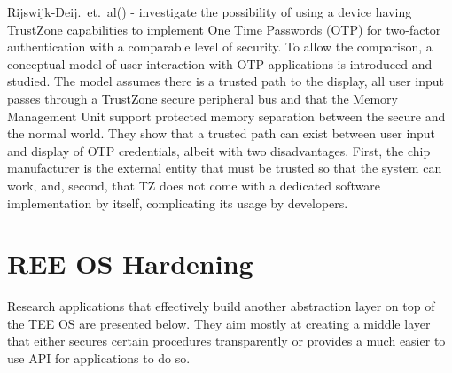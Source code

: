 \documentclass[cameraready]{cseminar}
\begin{document}
Rijswijk-Deij.~et.~al(\cite{twofactorauth}) - investigate the possibility of using a device having TrustZone capabilities to implement One Time Passwords (OTP) for two-factor authentication with a comparable level of security. To allow the comparison, a conceptual model of user interaction with OTP applications is introduced and studied. The model assumes there is a trusted path to the display, all user input passes through a TrustZone secure peripheral bus and that the Memory Management Unit support protected memory separation between the secure and the normal world. They show that a trusted path can exist between user input and display of OTP credentials, albeit with two disadvantages. First, the chip manufacturer is the external entity that must be trusted so that the system can work, and, second, that TZ does not come with a dedicated software implementation by itself, complicating its usage by developers.


\section{REE OS Hardening}
\label{osapps}

Research applications that effectively build another abstraction layer on top of the TEE OS are presented below. They aim mostly at creating a middle layer that either secures certain procedures transparently or provides a much easier to use API for applications to do so.
\end{document}
